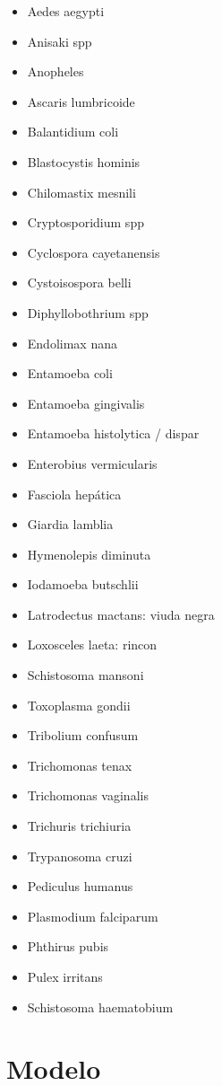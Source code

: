 \documentclass[letter,12pt]{report}
\begin{document}
\begin{itemize}
    \item Aedes aegypti
    \item Anisaki spp
    \item Anopheles
    \item Ascaris lumbricoide
    \item Balantidium coli
    \item Blastocystis hominis
    \item Chilomastix mesnili
    \item Cryptosporidium spp
    \item Cyclospora cayetanensis
    \item Cystoisospora belli
    \item Diphyllobothrium spp
    \item Endolimax nana
    \item Entamoeba coli
    \item Entamoeba gingivalis
    \item Entamoeba histolytica / dispar
    \item Enterobius vermicularis
    \item Fasciola hepática
    \item Giardia lamblia
    \item Hymenolepis diminuta
    \item Iodamoeba butschlii
    \item Latrodectus mactans: viuda negra
    \item Loxosceles laeta: rincon
    \item Schistosoma mansoni
    \item Toxoplasma gondii
    \item Tribolium confusum
    \item Trichomonas tenax
    \item Trichomonas vaginalis
    \item Trichuris trichiuria
    \item Trypanosoma cruzi
    \item Pediculus humanus
    \item Plasmodium falciparum
    \item Phthirus pubis
    \item Pulex irritans
    \item Schistosoma haematobium
\end{itemize}

\section{Modelo}
\end{document}
